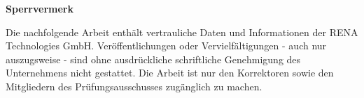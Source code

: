 \begin{center}
	\textbf{Sperrvermerk}
\end{center}
Die nachfolgende Arbeit enthält vertrauliche Daten und Informationen der RENA Technologies GmbH. Veröffentlichungen oder Vervielfältigungen - auch nur auszugsweise - sind ohne ausdrückliche schriftliche Genehmigung des Unternehmens nicht gestattet. Die Arbeit ist nur den Korrektoren sowie den Mitgliedern des Prüfungsausschusses zugänglich zu machen. 
